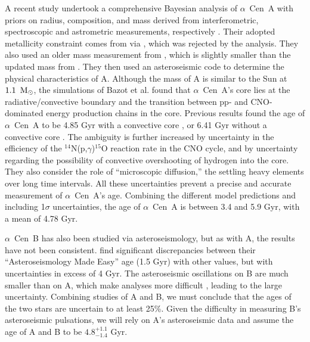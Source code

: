 \documentclass[preprint,12pt]{aastex}
\def\msun{{\rm\,M_\odot}}
\def\eg{{\it e.g.\ }}
\def\acen{{$\alpha$~Cen}}
\begin{document}
A recent study undertook a comprehensive Bayesian analysis of \acen~A
with priors on radius, composition, and mass derived from
interferometric, spectroscopic and astrometric measurements,
respectively \citep{Bazot16}. Their adopted metallicity constraint
comes from \cite{NeuforgeMagain97} via \cite{Thoul03}, which was
rejected by the \cite{HinkelKane13} analysis. They also used an older
mass measurement from \cite{Pourbaix02}, which is slightly smaller
than the updated mass from \cite{PourbaixBoffin16}. They then used an
asteroseismic code to determine the physical characteristics of
A. Although the mass of A is similar to the Sun at $1.1~\msun$, the
simulations of Bazot et al. found that \acen~A's core lies at the
radiative/convective boundary and the transition between pp- and
CNO-dominated energy production chains in the core. Previous results
found the age of \acen~A to be 4.85 Gyr with a convective core
\citep{Thevenin02}, or 6.41 Gyr without a convective core
\citep{Thoul03}. The ambiguity is further increased by uncertainty in
the efficiency of the $^{14}$N(p,$\gamma$)$^{15}$O reaction rate in
the CNO cycle, and by uncertainty regarding the possibility of
convective overshooting of hydrogen into the core. They also consider
the role of ``microscopic diffusion,'' the settling heavy
elements over long time intervals. All these uncertainties
prevent a precise and accurate measurement of \acen~A's
age. Combining the different model predictions and including 1$\sigma$
uncertainties, the age of \acen~A is between 3.4 and 5.9 Gyr,
with a mean of 4.78 Gyr.

\acen~B has also been studied via asteroseismology, but as with A, the
results have not been consistent. \cite{Lundkvist14} find significant
discrepancies between their ``Asteroseismology Made Easy'' age (1.5
Gyr) with other values, but with uncertainties in excess of 4 Gyr. The
asteroseismic oscillations on B are much smaller than on A, which make
analyses more difficult \citep[see, \eg,][]{CarrierBourban03},
leading to the large uncertainty. Combining studies of A and B, we
must conclude that the ages of the two stars are uncertain to at least
25\%. Given the difficulty in measuring B's asteroseismic pulsations,
we will rely on A's asteroseismic data and assume the age of A and B
to be $4.8^{+1.1}_{-1.4}$ Gyr.
\end{document}
